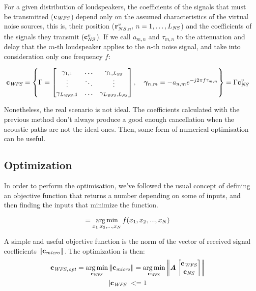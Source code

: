 For a given distribution of loudspeakers, the coefficients of the signals that must be transmitted ($\mathbf{c}_{\mathit{WFS}}$) depend only on the assumed characteristics of the virtual noise sources, this is, their position ($\mathbf{r}_{NS, n}^v,\, n = 1, \ldots, L_\mathit{NS}$) and the coefficients of the signals they transmit ($\mathbf{c}_{\mathit{NS}}^v$). If we call $a_{m,n}$ and $\tau_{m,n}$ to the attenuation and delay that the $m$-th loudspeaker applies to the $n$-th noise signal, and take into consideration only one frequency $f$:

\begin{equation}
\cwfs = 
 \left\{ \wfsNormCoef[mat] = \begin{bmatrix}
\wfsNormCoef[scalar]_{1,1} & \ldots & \wfsNormCoef[scalar]_{1,\numNS} \\
\vdots & \ddots & \vdots \\
\wfsNormCoef[scalar]_{\numWFS,1} & \ldots & \wfsNormCoef[scalar]_{\numWFS,\numNS}
\end{bmatrix},\quad \wfsNormCoef_{n,m} = -a_{n,m} e^{-j 2 \pi f \tau_{m,n}} 
\right\}
= \wfsNormCoef[mat] \cns^v
\end{equation}

Nonetheless, the real scenario is not ideal. The coefficients calculated with the previous method don't always produce a good enough cancellation when the acoustic paths are not the ideal ones. Then, some form of numerical optimisation can be useful.

\subsection{Optimization}
In order to perform the optimisation, we've followed the usual concept of defining an objective function that returns a number depending on some of inputs, and then finding the inputs that minimize the function.

\begin{equation}
[x_{\mathit{opt} (1)}, x_{\mathit{opt} (2)}, ..., x_{\mathit{opt} (N)}] = \argmin_{x_1, x_2, ..., x_N} f(x_1, x_2, ..., x_N)
\label{optimisationGeneral}
\end{equation}

A simple and useful objective function is the norm of the vector of received signal coefficients $\left\| \mathbf{c_\mathit{micro}} \right\|$. The optimization is then:
\begin{gather}
\mathbf{c_{\mathit{WFS}, \mathit{opt}}} =
\operatorname*{arg\,min}_{\mathbf{c_\mathit{WFS}}}
\left\| \mathbf{c_\mathit{micro}} \right\| =
\operatorname*{arg\,min}_{\mathbf{c_\mathit{WFS}}}
\left\| \bm{\mathit{A}}
\begin{bmatrix}
\mathbf{c_\mathit{WFS}}\\
\mathbf{c_\mathit{NS}}\\
\end{bmatrix}
 \right\| \\
\left | \mathbf{c_{\mathit{WFS}}} \right | <= 1
\label{OptConstraint}
\end{gather}

